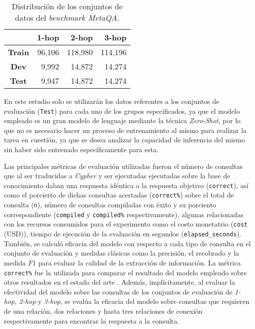 \begin{table}[h]
\centering
\begin{tabular}{|c|r|r|r|}
\hline
 & \textbf{1-hop} & \textbf{2-hop} & \textbf{3-hop} \\ \hline
\textbf{Train} & 96,106 & 118,980 & 114,196 \\ \hline
\textbf{Dev} & 9,992 & 14,872 & 14,274 \\ \hline
\textbf{Test} & 9,947 & 14,872 & 14,274 \\ \hline
\end{tabular}
\caption{Distribución de los conjuntos de datos del \textit{benchmark MetaQA}.}
\label{tab:metaqatable}
\end{table}

En este estudio solo se utilizarán los datos referentes a los conjuntos de evaluación (\texttt{Test}) para cada uno de los grupos especificados, ya que el modelo empleado es un gran modelo de lenguaje mediante la técnica \textit{Zero-Shot}, por lo que no es necesario hacer un proceso de entrenamiento al mismo para realizar la tarea en cuestión, ya que se desea analizar la capacidad de inferencia del mismo sin haber sido entrenado específicamente para esta.

Las principales métricas de evaluación utilizadas fueron el número de consultas que al ser traducidas a \textit{Cypher} y ser ejecutadas ejecutadas sobre la base de conocimiento daban una respuesta idéntica a la respuesta objetivo (\texttt{correct}), así como el porcierto de dichas consultas acertadas (\texttt{correct\%}) sobre el total de consulta (\texttt{n}), número de consultas compiladas con éxito y su porciento correspondiente (\texttt{compiled} y \texttt{compiled\%} respectivamente), algunas relacionadas con los recursos consumidos para el experimento como el costo monetatrio (\texttt{cost} (USD)), tiempo de ejecución de la evaluación en segundos (\texttt{elapsed\_seconds}). También, se calculó eficacia del modelo con respecto a cada tipo de consulta en el conjunto de evaluación y medidas clásicas como la precisión, el recobrado y la medida $F1$ para evaluar la calidad de la extracción de información. La métrica \texttt{correct\%} fue la utilizada para comparar el resultado del modelo empleado sobre otros resultados en el estado del arte \cite{gpt4all}. Además, implícitamente, al evaluar la efectividad del modelo sobre las consultas de los conjuntos de evaluación de \textit{1-hop, 2-hop} y \textit{3-hop}, se evalúa la eficacia del modelo sobre consultas que requieren de una relación, dos relaciones y hasta tres relaciones de conexión respectivamente para encontrar la respuesta a la consulta.

